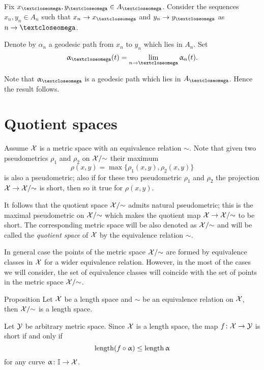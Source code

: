 Fix $x_\o,y_\o\in A_\o$.
Consider the sequences $x_n,y_n\in A_n$ such that $x_n\to x_\o$ and $y_n\to y_\o$ as $n\to\o$.

Denote by $\alpha_n$ a geodesic path from $x_n$ to $y_n$ which lies in $A_n$.
Set
\[\alpha_\o(t)=\lim_{n\to \o}\alpha_n(t).\]

Note that $\alpha_\o$ is a geodesic path which lies in $A_\o$.
Hence the result follows.
\qeds






\section{Quotient spaces}\label{sec:quotient}

 Assume $\mathcal{X}$ is a metric space
with an equivalence relation $\sim$.
Note that given two pseudometrics $\rho_1$ and $\rho_2$ on $\mathcal{X}/{\sim}$
their maximum 
\[\rho(x,y)=\max\{\rho_1(x,y),\rho_2(x,y)\}\]
is also a pseudometric;
also if for these two pseudometric $\rho_1$ and $\rho_2$ the projection $\spc{X}\to\spc{X}/{\sim}$ is short, then so it true for  $\rho(x,y)$.

It follows that 
the quotient space $\mathcal{X}/{\sim}$ admits natural pseudometric;
this is the maximal pseudometric on  $\mathcal{X}/{\sim}$ 
which makes the quotient map 
$\spc{X}\to\spc{X}/{\sim}$ to be short.
The corresponding metric space will be also denoted as $\mathcal{X}/{\sim}$
and will be called the \emph{quotient space} of $\mathcal{X}$ by the equivalence relation $\sim$.

In general case the points of the metric space $\mathcal{X}/{\sim}$
are formed by equivalence classes in $\mathcal{X}$
for a wider equivalence relation.
However, in the most of the cases we will consider, 
the set of equivalence classes will coincide with the set of points in the metric space $\mathcal{X}/{\sim}$.



\begin{thm}{Proposition}\label{prop:length-X}
Let $\mathcal{X}$ be a length space and 
$\sim$ be an equivalence relation on $\mathcal{X}$, then $\mathcal{X}/{\sim}$
is a length space.
\end{thm}

Let $\mathcal{Y}$ be arbitrary metric space.
Since $\mathcal{X}$ is a length space,
the map $f\:\spc{X}\to \spc{Y}$ is short if and only if 
\[\length(f\circ\alpha)\le \length\alpha\]
for any curve
$\alpha\:\II\to \spc{X}$.

